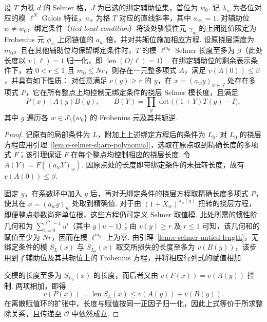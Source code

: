 \begin{lemma}[将挠层长度多项式限制至辅助位直线]
\label{lem:c-selmer-line-divisibility}
\emitthmsource
设 $T$ 为秩 $d$ 的 Selmer 格，$J$ 为已选的绑定辅助位集，首位为 $w_0$.
记 $\lambda_w$ 为各位对应的模 $\ell^N$ Galois 特征，$a_w$ 为格 $T$ 对应的直线斜率，其中 $a_{w_0}=1$.
对辅助位 $w\ne w_0$，绑定条件（\emph{tied local condition}）将该处驯惯性元 $\gamma_w$ 的上闭链值限定为 Frobenius 元 $\phi_w$ 上闭链值的 $a_w$ 倍，并对共轭位施加相应方程.
设原挠层深度为 $m_0$，且在其他辅助位均保留绑定条件时，$T$ 的模 $\ell^{m_0}$ Selmer 长度至多为 $\beta$（此处长度以 $v(\ell)=1$ 归一化，即 $\operatorname{len}(O/\ell)=1$）.
在绑定辅助位的剩余表示条件下，若 $0<r\le1$ 且 $m_0\le Nr$，则存在一元整多项式 $A$，满足 $v(A(0))\le\beta$，并具有如下性质：
对任意满足 $v(y)\ge r$ 的 $y$，在 $x=(a_wy)_{w\in J}$ 处存在多项式 $P$，它在所有整点上均控制无绑定条件的挠层 Selmer 模长度，且满足
\[
 P(x)\mid A(y)B(y),\qquad
 B(Y)=\prod_{g}\det\bigl((1+Y)T(g)-I\bigr),
\]
其中 $g$ 遍历各 $w\in J\setminus\{w_0\}$ 的 Frobenius 元及其共轭逆.
\end{lemma}
\begin{proof}
记原有的局部条件为 $L$，附加上上述绑定方程后的条件为 $L_0$.
对 $L_0$ 的挠层方程应用引理~\ref{lem:c-selmer-sharp-polynomial}，选取在原点取到精确长度的多项式 $F$；该引理保证 $F$ 在每个整点均控制相应的挠层长度.
令 $A(Y)=F((a_wY)_w)$. 因原点处的长度即带绑定条件的未扭转长度，故有 $v(A(0))\le\beta$.

固定 $y$，在系数环中加入 $y$ 后，再对无绑定条件的挠层方程取精确长度多项式 $P$，使其在 $x=(a_wy)_w$ 处取到精确值.
对于由 $(1+X_w)^{\lambda_w(g)}$ 扭转的挠层方程，即便整点参数尚非单位根，这些方程仍可定义 Selmer 取值模.
此处所需的惯性阶几何和为 $\sum_{i=0}^{\ell^N-1}u^i$（其中 $y\mid u-1$）；由 $v(y)\ge r$ 及 $r\le1$ 可知，该几何和的赋值至少为 $Nr$，因而在模 $\ell^{m_0}$ 上为零.
由引理~\ref{lem:c-selmer-untied-length}，无绑定条件的模 $S_L(x)$ 与 $S_{L_0}(x)$ 取交所损失的长度至多为 $v(B(y))$，该步用到了辅助位及其共轭位上的 Frobenius 方程，并将相应行列式的赋值相加.

交模的长度至多为 $S_{L_0}(x)$ 的长度，而后者又由 $v(F(x))=v(A(y))$ 控制.
两项相加，即得
\[
 v(P(x))=\operatorname{len}S_L(x)\le v(A(y))+v(B(y)).
\]
在离散赋值环的扩张中，长度与赋值按同一正因子归一化，因此上式等价于所求整除关系，且传递至 $\mathcal O$ 中依然成立.
\end{proof}

